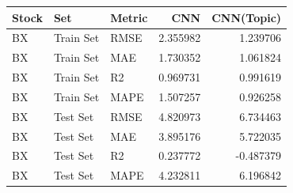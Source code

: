 \begin{tabular}{lllrr}
\toprule
Stock & Set & Metric & CNN & CNN(Topic) \\
\midrule
BX & Train Set & RMSE & 2.355982 & 1.239706 \\
BX & Train Set & MAE & 1.730352 & 1.061824 \\
BX & Train Set & R2 & 0.969731 & 0.991619 \\
BX & Train Set & MAPE & 1.507257 & 0.926258 \\
BX & Test Set & RMSE & 4.820973 & 6.734463 \\
BX & Test Set & MAE & 3.895176 & 5.722035 \\
BX & Test Set & R2 & 0.237772 & -0.487379 \\
BX & Test Set & MAPE & 4.232811 & 6.196842 \\
\bottomrule
\end{tabular}

